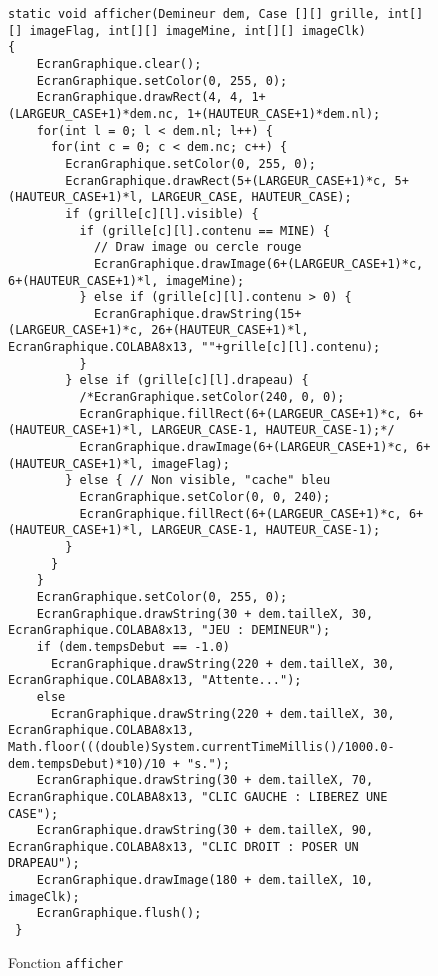 \documentclass[a4paper, 12pt, oneside]{article}
\newcommand{\var}[1]{\texttt{#1}}
\begin{document}
\begin{figure}[hpt]
	\center
	\caption{\label{fig:fnAfficher} Fonction \var{afficher}}
\begin{lstlisting}
static void afficher(Demineur dem, Case [][] grille, int[][] imageFlag, int[][] imageMine, int[][] imageClk) 
{
    EcranGraphique.clear();
    EcranGraphique.setColor(0, 255, 0);
    EcranGraphique.drawRect(4, 4, 1+(LARGEUR_CASE+1)*dem.nc, 1+(HAUTEUR_CASE+1)*dem.nl);
    for(int l = 0; l < dem.nl; l++) {
      for(int c = 0; c < dem.nc; c++) {
        EcranGraphique.setColor(0, 255, 0);
        EcranGraphique.drawRect(5+(LARGEUR_CASE+1)*c, 5+(HAUTEUR_CASE+1)*l, LARGEUR_CASE, HAUTEUR_CASE);
        if (grille[c][l].visible) {
          if (grille[c][l].contenu == MINE) {
            // Draw image ou cercle rouge
            EcranGraphique.drawImage(6+(LARGEUR_CASE+1)*c, 6+(HAUTEUR_CASE+1)*l, imageMine);
          } else if (grille[c][l].contenu > 0) {
            EcranGraphique.drawString(15+(LARGEUR_CASE+1)*c, 26+(HAUTEUR_CASE+1)*l, EcranGraphique.COLABA8x13, ""+grille[c][l].contenu);
          }
        } else if (grille[c][l].drapeau) {
          /*EcranGraphique.setColor(240, 0, 0);
          EcranGraphique.fillRect(6+(LARGEUR_CASE+1)*c, 6+(HAUTEUR_CASE+1)*l, LARGEUR_CASE-1, HAUTEUR_CASE-1);*/
          EcranGraphique.drawImage(6+(LARGEUR_CASE+1)*c, 6+(HAUTEUR_CASE+1)*l, imageFlag);
        } else { // Non visible, "cache" bleu
          EcranGraphique.setColor(0, 0, 240);
          EcranGraphique.fillRect(6+(LARGEUR_CASE+1)*c, 6+(HAUTEUR_CASE+1)*l, LARGEUR_CASE-1, HAUTEUR_CASE-1);
        }
      }
    }
    EcranGraphique.setColor(0, 255, 0);
    EcranGraphique.drawString(30 + dem.tailleX, 30, EcranGraphique.COLABA8x13, "JEU : DEMINEUR");
    if (dem.tempsDebut == -1.0)
      EcranGraphique.drawString(220 + dem.tailleX, 30, EcranGraphique.COLABA8x13, "Attente...");
    else
      EcranGraphique.drawString(220 + dem.tailleX, 30, EcranGraphique.COLABA8x13, Math.floor(((double)System.currentTimeMillis()/1000.0-dem.tempsDebut)*10)/10 + "s.");
    EcranGraphique.drawString(30 + dem.tailleX, 70, EcranGraphique.COLABA8x13, "CLIC GAUCHE : LIBEREZ UNE CASE");
    EcranGraphique.drawString(30 + dem.tailleX, 90, EcranGraphique.COLABA8x13, "CLIC DROIT : POSER UN DRAPEAU");
    EcranGraphique.drawImage(180 + dem.tailleX, 10, imageClk);
    EcranGraphique.flush();
 }
\end{lstlisting}
\end{figure}
\end{document}
